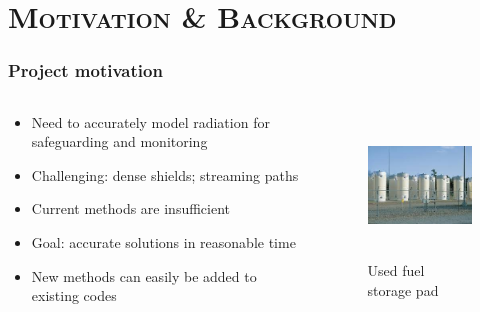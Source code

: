\documentclass[handout]{beamer}
\renewcommand{\(}{\begin{columns}}
\renewcommand{\)}{\end{columns}}
\newcommand{\<}[1]{\begin{column}{#1}}
\renewcommand{\>}{\end{column}}
\begin{document}
\section{\scshape Motivation \& Background}
\begin{frame}[fragile]
  \frametitle{Project motivation}

\begin{columns}
  \begin{column}{0.55\textwidth}
	\begin{itemize}
	\item Need to accurately model radiation for safeguarding and monitoring
	\item \alert{Challenging}: dense shields; streaming paths
	\item Current methods are insufficient
	\item \alert{Goal}: accurate solutions in reasonable time
	\item New methods can easily be added to existing codes
	\end{itemize}
  \end{column}
  \begin{column}{0.45\textwidth}
  	\begin{figure}
  	\begin{center}
  		\includegraphics[height=1.5in,clip]{../figs/isfsi}
		\caption{Used fuel storage pad}
	\end{center}
  	\end{figure}
  \end{column}
\end{columns}

\end{frame}
\end{document}
